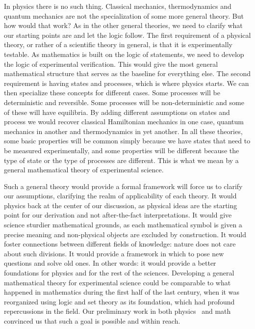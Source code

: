 \documentclass[letterpaper]{article}
\theoremstyle{plain}%
\theoremstyle{definition}
\theoremstyle{remark}
\numberwithin{equation}{section}
\begin{document}
In physics there is no such thing. Classical mechanics, thermodynamics and quantum mechanics are not the specialization of some more general theory. But how would that work? As in the other general theories, we need to clarify what our starting points are and let the logic follow. The first requirement of a physical theory, or rather of a scientific theory in general, is that it is experimentally testable. As mathematics is built on the logic of statements, we need to develop the logic of experimental verification. This would give the most general mathematical structure that serves as the baseline for everything else. The second requirement is having states and processes, which is where physics starts. We can then specialize these concepts for different cases. Some processes will be deterministic and reversible. Some processes will be non-deterministic and some of these will have equilibria. By adding different assumptions on states and process we would recover classical Hamiltonian mechanics in one case, quantum mechanics in another and thermodynamics in yet another. In all these theories, some basic properties will be common simply because we have states that need to be measured experimentally, and some properties will be different because the type of state or the type of processes are different. This is what we mean by a general mathematical theory of experimental science.

Such a general theory would provide a formal framework will force us to clarify our assumptions, clarifying the realm of applicability of each theory. It would physics back at the center of our discussion, as physical ideas are the starting point for our derivation and not after-the-fact interpretations. It would give science sturdier mathematical grounds, as each mathematical symbol is given a precise meaning and non-physical objects are excluded by construction. It would foster connections between different fields of knowledge: nature does not care about such divisions. It would provide a framework in which to pose new questions and solve old ones. In other words: it would provide a better foundations for physics and for the rest of the sciences. Developing a general mathematical theory for experimental science could be comparable to what happened in mathematics during the first half of the last century, when it was reorganized using logic and set theory as its foundation, which had profound repercussions in the field. Our preliminary work in both physics~\cite{Carc1} and math~\cite{Carc2} convinced us that such a goal is possible and within reach.
\end{document}
